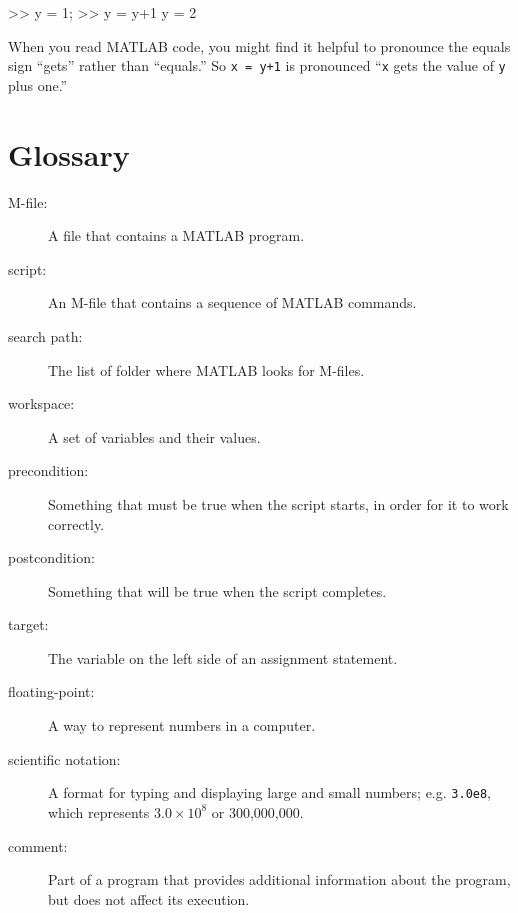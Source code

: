 \documentclass[main.tex]{subfiles}
\begin{document}
\begin{code}
>> y = 1;
>> y = y+1
y = 2
\end{code}

When you read MATLAB code, you might find it helpful to pronounce
the equals sign ``gets'' rather than ``equals.''  So {\tt x = y+1}
is pronounced ``{\tt x} gets the value of {\tt y} plus one.''


\section{Glossary}

\begin{description}

\item[M-file:] A file that contains a MATLAB program.

\item[script:] An M-file that contains a sequence of MATLAB commands.

\item[search path:] The list of folder where MATLAB looks for
M-files.

\item[workspace:] A set of variables and their values.

\item[precondition:] Something that must be true when the script
starts, in order for it to work correctly.

\item[postcondition:] Something that will be true when the script
completes.

\item[target:] The variable on the left side of an assignment statement.


\item[floating-point:] A way to represent numbers in a computer.

\item[scientific notation:] A format for typing and displaying large
and small numbers; e.g. {\tt 3.0e8}, which represents $3.0 \times 10^8$
or 300,000,000.

\item[comment:] Part of a program that provides additional information
about the program, but does not affect its execution.

\end{description}
\end{document}
